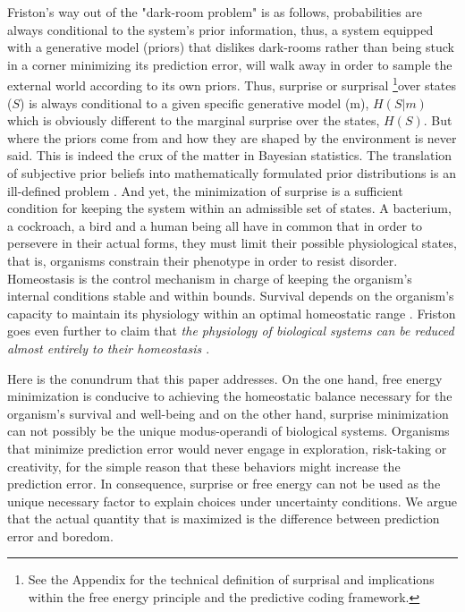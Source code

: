 \documentclass[11pt,twocolumn]{article}
\begin{document}
Friston's way out of the "dark-room problem" is as follows, probabilities are always conditional to the system's prior information, thus, a system equipped with a generative model (priors) that dislikes dark-rooms rather than being stuck in a corner minimizing its prediction error, will walk away in order to sample the external world according to its own priors. Thus, surprise or surprisal  \footnote{See the Appendix for the technical definition of surprisal and implications within the free energy principle and the predictive coding framework.}over states ($S$) is always conditional to a given specific generative model (m), $H(S|m)$ which is obviously different to the marginal surprise over the states, $H(S)$.
But where the priors come from and how they are shaped by the environment is never said. This is indeed the crux of the matter in Bayesian statistics. The translation of subjective prior beliefs into mathematically formulated prior distributions is an ill-defined problem \citep{Gomez-ramirez_limitations_2013}. 
And yet, the minimization of surprise is a sufficient condition for keeping the system within an admissible set of states. 
A bacterium, a cockroach, a bird and a human being all have in common that in order to persevere in their actual forms, they must limit their possible physiological states, that is, organisms constrain their phenotype in order to resist disorder. 
Homeostasis is the control mechanism in charge of keeping the organism's internal conditions stable and within bounds. Survival depends on the organism's capacity to maintain its physiology within an optimal homeostatic range \citep{damasio_nature_2013}. Friston goes even further to claim that \emph{the physiology of biological systems can be reduced almost entirely to their homeostasis \citep{friston_free-energy_2010}}. 

Here is the conundrum that this paper addresses. On the one hand, free energy minimization is conducive to achieving the homeostatic balance necessary for the organism's survival and well-being and on the other hand, surprise minimization can not possibly be the unique modus-operandi of biological systems. Organisms that minimize prediction error would never engage in exploration, risk-taking or creativity, for the simple reason that these behaviors might increase the prediction error. 
In consequence, surprise or free energy can not be used as the unique necessary factor to explain choices under uncertainty conditions. We argue that the actual quantity that is maximized is the difference between prediction error and boredom. 
\end{document}
